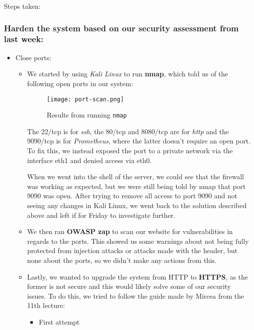 Steps taken:

\subsubsection{Harden the system based on our security assessment from last week:}
\label{log:harden-the-system-based-on-our-security-assessment-from-last-week}

\begin{itemize}
\item Close ports:

    \begin{itemize}
        \item We started by using \emph{Kali Linux} to run \textbf{nmap}, which told us of the following open ports in our system:
        \begin{figure}[H]
        \centering
        \texttt{[image: port-scan.png]}
        \caption{Results from running \texttt{nmap}}
        \end{figure}
        The 22/tcp is for \emph{ssh}, the 80/tcp and 8080/tcp are for \emph{http} and the 9090/tcp is for \emph{Prometheus}, where the latter doesn't require an open port. To fix this, we instead exposed the port to a private network via the interface eth1 and denied access via eth0.

        When we went into the shell of the server, we could see that the firewall was working as expected, but we were still being told by nmap that port 9090 was open. After trying to remove all access to port 9090 and not seeing any changes in Kali Linux, we went back to the solution described above and left if for Friday to investigate further.

        \item We then ran \textbf{OWASP zap} to scan our website for vulnerabilities in regards to the ports. This showed us some warnings about not being fully protected from injection attacks or attacks made with the header, but none about the ports, so we didn't make any actions from this.
        \item Lastly, we wanted to upgrade the system from HTTP to \textbf{HTTPS}, as the former is not secure and this would likely solve some of our security issues. To do this, we tried to follow the guide made by Mircea from the 11th lecture:

        \begin{itemize}
            \item First attempt


\end{itemize}
\end{itemize}
\end{itemize}
